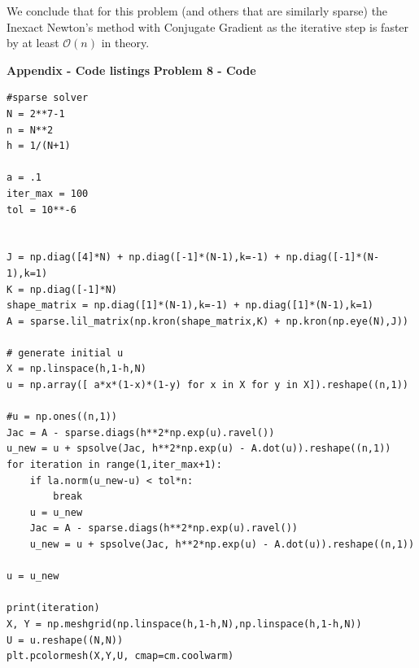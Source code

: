 \documentclass[12pt]{article}
\newcommand{\problem}[1]{\hspace{-4 ex} \large \textbf{Problem #1} }
\begin{document}
We conclude that for this problem (and others that are similarly sparse) the Inexact Newton's method with Conjugate Gradient as the iterative step is faster by at least $\mathcal{O}(n)$ in theory.

\bigbreak

{\hspace{-4 ex} \huge \textbf{Appendix - Code listings}}\bigbreak
\problem{8 - Code}
\begin{lstlisting}
#sparse solver
N = 2**7-1
n = N**2
h = 1/(N+1)

a = .1
iter_max = 100
tol = 10**-6


J = np.diag([4]*N) + np.diag([-1]*(N-1),k=-1) + np.diag([-1]*(N-1),k=1)
K = np.diag([-1]*N)
shape_matrix = np.diag([1]*(N-1),k=-1) + np.diag([1]*(N-1),k=1)
A = sparse.lil_matrix(np.kron(shape_matrix,K) + np.kron(np.eye(N),J))

# generate initial u
X = np.linspace(h,1-h,N)
u = np.array([ a*x*(1-x)*(1-y) for x in X for y in X]).reshape((n,1))

#u = np.ones((n,1))
Jac = A - sparse.diags(h**2*np.exp(u).ravel())
u_new = u + spsolve(Jac, h**2*np.exp(u) - A.dot(u)).reshape((n,1))
for iteration in range(1,iter_max+1):
	if la.norm(u_new-u) < tol*n:
		break
	u = u_new
	Jac = A - sparse.diags(h**2*np.exp(u).ravel())
	u_new = u + spsolve(Jac, h**2*np.exp(u) - A.dot(u)).reshape((n,1))

u = u_new

print(iteration)
X, Y = np.meshgrid(np.linspace(h,1-h,N),np.linspace(h,1-h,N))
U = u.reshape((N,N))
plt.pcolormesh(X,Y,U, cmap=cm.coolwarm)
\end{lstlisting}
\end{document}
